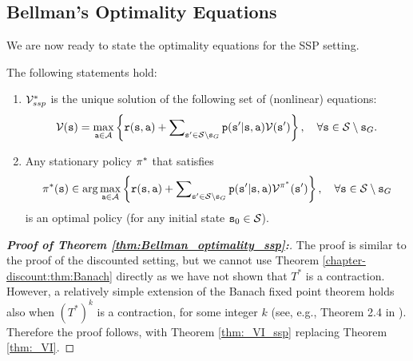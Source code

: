 \subsection{Bellman's Optimality Equations}
We are now ready to state the optimality equations for the SSP setting.

\begin{theorem}
\label{thm:Bellman_optimality_ssp}
The following statements hold:
\begin{enumerate}
  \item $\mathcal{V}_{ssp}^*$ is the unique solution of the following set of (nonlinear) equations:
\begin{equation}\label{eq:Bellman2}
\mathcal{V}({\tt s}) = \mathop {\max }\limits_{{\tt a} \in \mathcal{A}}
\left\{ {{\tt r}({\tt s},{\tt a}) + \sum\nolimits_{{\tt s}'
\in \mathcal{S} \setminus {\tt s}_G} {{\tt p}({\tt s}'|{\tt s},{\tt a})\mathcal{V}({\tt s}')} } \right\},
\quad \forall {\tt s} \in \mathcal{S} \setminus {\tt s}_G.
\end{equation}
  \item Any stationary policy ${\pi ^*}$ that satisfies
\[{\pi ^*}({\tt s}) \in \arg {\max _{{\tt a}\in \mathcal{A}}}\left\{ {{\tt r}({\tt s},{\tt a}) +  \sum\nolimits_{{\tt s}' \in \mathcal{S} \setminus {\tt s}_G} {{\tt p}({\tt s}'|{\tt s},{\tt a})\mathcal{V}^{\pi^*}({\tt s}')} } \right\},
\quad \forall {\tt s} \in \mathcal{S} \setminus {\tt s}_G\]
     is an optimal policy (for any initial state ${{\tt s}_0} \in \mathcal{S}$).
\end{enumerate}
\end{theorem}

\begin{proof}[\textbf{Proof of Theorem \ref{thm:Bellman_optimality_ssp}:}]
The proof is similar to the proof of the discounted setting, but we cannot use Theorem \ref{chapter-discount:thm:Banach} directly as we have not shown that $T^*$ is a contraction. However, a relatively simple extension of the Banach fixed point theorem holds also when $(T^*)^{k}$ is a contraction, for some integer $k$ (see, e.g., Theorem 2.4 in \cite{latif2014banach}). Therefore the proof follows, with Theorem \ref{thm:_VI_ssp} replacing Theorem \ref{thm:_VI}.
\end{proof}




